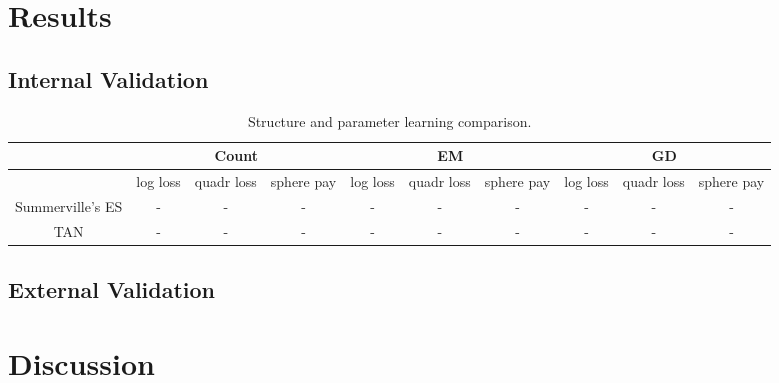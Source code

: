 \documentclass{UoYCSproject}
\begin{document}
\chapter{Results}
\section{Internal Validation} %
\begin{table}[htb]
  \caption{ Structure and parameter learning comparison.}
  \begin{center}
  \begin{tabular}{|c|c|c|c|c|c|c|c|c|c|}
  \hline
  & \multicolumn{3}{|c|}{Count} & \multicolumn{3}{|c|}{EM} & \multicolumn{3}{|c|}{GD} \\
  \hline
  & log loss & quadr loss & sphere pay & log loss & quadr loss & sphere pay &log loss & quadr loss & sphere pay \\
  \hline
  Summerville's ES & - & - & - & - & - & - & - & - & - \\
  \hline
  TAN & - & - & - & - & - & - & - & - & -\\
  \hline
  \end{tabular}
  \end{center}
  \label{table:BNetCompare}
  \end{table}

\section{External Validation} %

\chapter{Discussion}
\end{document}
